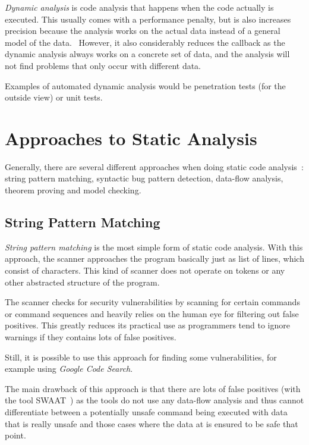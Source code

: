 \emph{Dynamic analysis} is code analysis that happens when the code actually is executed. This usually comes with a performance penalty, but is also increases precision because the analysis works on the actual data instead of a general model of the data.~\cite{chess-west} However, it also considerably reduces the callback as the dynamic analysis always works on a concrete set of data, and the analysis will not find problems that only occur with different data.~\cite{static-code-analysis}

Examples of automated dynamic analysis would be penetration tests (for the outside view) or unit tests.



\section{Approaches to Static Analysis}
Generally, there are several different approaches when doing static code analysis~\cite{comparison-of-bug-finding-tools}: string pattern matching, syntactic bug pattern detection, data-flow analysis, theorem proving and model checking.


\subsection{String Pattern Matching}

\emph{String pattern matching} is the most simple form of static code analysis. With this approach, the scanner approaches the program basically just as list of lines, which consist of characters. This kind of scanner does not operate on tokens or any other abstracted structure of the program.

The scanner checks for security vulnerabilities by scanning for certain commands or command sequences and heavily relies on the human eye for filtering out false positives. This greatly reduces its practical use as programmers tend to ignore warnings if they contains lots of false positives.~\cite{understanding-value}

Still, it is possible to use this approach for finding some vulnerabilities, for example using \emph{Google Code Search}.~\cite{google-code-search}

The main drawback of this approach is that there are lots of false positives (\eg with the tool SWAAT~\cite{swaat}) as the tools do not use any data-flow analysis and thus cannot differentiate between a potentially unsafe command being executed with data that is really unsafe and those cases where the data at is ensured to be safe that point.

